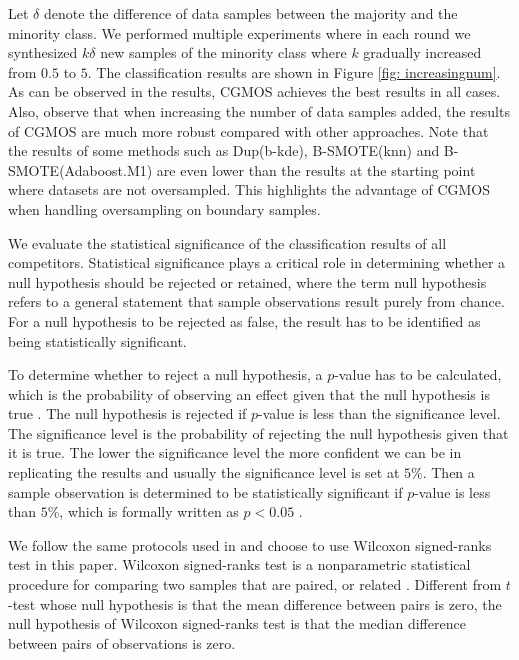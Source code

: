 \documentclass{iitthesis}
\begin{document}
Let $\delta$ denote the difference of data samples between the majority and the minority class. We performed multiple experiments where in each round we synthesized $k\delta$ new samples of the  minority class where $k$ gradually increased from $0.5$ to $5$. The classification results are shown in Figure \ref{fig: increasingnum}. As can be observed in the results, CGMOS achieves the best results in all cases. Also, observe that when increasing the number of data samples added, the results of CGMOS are much more robust compared with other approaches. Note that the results of some methods such as Dup(b-kde), B-SMOTE(knn) and B-SMOTE(Adaboost.M1) are even lower than the results at the starting point where datasets are not oversampled. This highlights the advantage of CGMOS when handling oversampling on boundary samples. 

 We evaluate the statistical significance of the classification results of all competitors. Statistical significance plays a critical role in determining whether a null hypothesis should be rejected or retained, where the term null hypothesis refers to a general statement that sample observations result purely from chance. For a null hypothesis to be rejected as false, the result has to be identified as being statistically significant.

To determine whether to reject a null hypothesis, a $p$-value has to be calculated, which is the probability of observing an effect given that the null hypothesis is true \cite{JLD:11}. The null hypothesis is rejected if $p$-value is less than the significance level. The significance level is the probability of rejecting the null hypothesis given that it is true. The lower the significance level the more confident we can be in replicating the results and usually the significance level is set at $5\%$. Then a sample observation is determined to be statistically significant if $p$-value is less than $5\%$, which is formally written as $p<0.05$ \cite{SM:06}.

We follow the same protocols used in \cite{demvsar2006statistical}\cite{chen2010ramoboost}\cite{barua2014mwmote} and choose to use Wilcoxon signed-ranks test in this paper. Wilcoxon signed-ranks test is a nonparametric statistical procedure for comparing two samples that are paired, or related \cite{GC09}. Different from $t$-test \cite{BF:08}\cite{zimmerman1997teacher}\cite{demvsar2006statistical} whose null hypothesis is that the mean difference between pairs is zero, the null hypothesis of Wilcoxon signed-ranks test is that the median difference between pairs of observations is zero.
\end{document}
